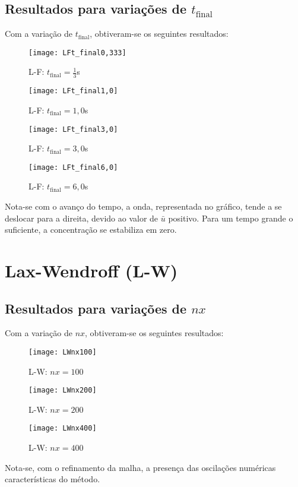 \subsection{Resultados para variações de $t_{\text{final}}$}
Com a variação de $t_{\text{final}}$, obtiveram-se os seguintes resultados:
\begin{figure}[H]
    \centering
    \texttt{[image: LFt\_final0,333]}
    \caption{L-F: $t_{\text{final}} = \frac{1}{3}$s}
\end{figure}
\begin{figure}[H]
    \centering
    \texttt{[image: LFt\_final1,0]}
    \caption{L-F: $t_{\text{final}} = 1,0$s}
\end{figure}
\begin{figure}[H]
    \centering
    \texttt{[image: LFt\_final3,0]}
    \caption{L-F: $t_{\text{final}} = 3,0$s}
\end{figure}
\begin{figure}[H]
    \centering
    \texttt{[image: LFt\_final6,0]}
    \caption{L-F: $t_{\text{final}} = 6,0$s}
\end{figure}
Nota-se com o avanço do tempo, a onda, representada no gráfico, tende a se
deslocar para a direita, devido ao valor de $\bar{u}$ positivo. Para um tempo
grande o suficiente, a concentração se estabiliza em zero.

\section{Lax-Wendroff (L-W)}

\subsection{Resultados para variações de $nx$}
Com a variação de $nx$, obtiveram-se os seguintes resultados:
\begin{figure}[H]
    \centering
    \texttt{[image: LWnx100]}
    \caption{L-W: $nx = 100$}
\end{figure}
\begin{figure}[H]
    \centering
    \texttt{[image: LWnx200]}
    \caption{L-W: $nx = 200$}
\end{figure}
\begin{figure}[H]
    \centering
    \texttt{[image: LWnx400]}
    \caption{L-W: $nx = 400$}
\end{figure}
Nota-se, com o refinamento da malha, a presença das oscilações numéricas
características do método.

